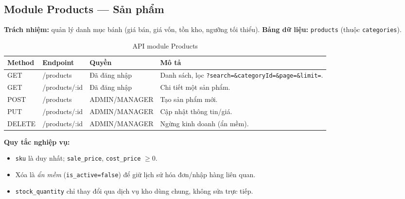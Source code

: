 \documentclass[12pt,a4paper]{report}
\begin{document}
\subsection{Module Products --- Sản phẩm}
\textbf{Trách nhiệm:} quản lý danh mục bánh (giá bán, giá vốn, tồn kho, ngưỡng tối thiểu). \textbf{Bảng dữ liệu:} \texttt{products} (thuộc \texttt{categories}).
\begin{table}[H]\centering\small
\begin{tabularx}{\textwidth}{|L{1.5cm}|L{3.6cm}|L{3.4cm}|X|}
\hline
\textbf{Method} & \textbf{Endpoint} & \textbf{Quyền} & \textbf{Mô tả} \\ \hline
GET & /products & Đã đăng nhập & Danh sách, lọc \texttt{?search=\&\allowbreak categoryId=\&\allowbreak page=\&\allowbreak limit=}. \\ \hline
GET & /products/:id & Đã đăng nhập & Chi tiết một sản phẩm. \\ \hline
POST & /products & ADMIN/MANAGER & Tạo sản phẩm mới. \\ \hline
PUT & /products/:id & ADMIN/MANAGER & Cập nhật thông tin/giá. \\ \hline
DELETE & /products/:id & ADMIN/MANAGER & Ngừng kinh doanh (ẩn mềm). \\ \hline
\end{tabularx}
\caption{API module Products}
\end{table}
\textbf{Quy tắc nghiệp vụ:}
\begin{itemize}[leftmargin=1.4cm,nosep]
  \item \texttt{sku} là duy nhất; \texttt{sale\_price}, \texttt{cost\_price} $\ge 0$.
  \item Xóa là \emph{ẩn mềm} (\texttt{is\_active=false}) để giữ lịch sử hóa đơn/nhập hàng liên quan.
  \item \texttt{stock\_quantity} chỉ thay đổi qua dịch vụ kho dùng chung, không sửa trực tiếp.
\end{itemize}
\end{document}
